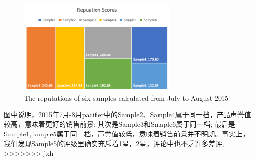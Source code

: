 \documentclass{mcmthesis}
\begin{document}
\begin{figure}[H] 
	\centering 
	\includegraphics[width=0.7\textwidth]{figures/reputations.png} 
	\caption{The reputations of six samples calculated from July to August 2015}
	\label{reputations} %
	
\end{figure}
图中说明，2015年7月-8月pacifier中的Sample2、Sample4属于同一档，产品声誉值较高，意味着更好的销售前景; 其次是Sample3和Smaple6属于同一档; 最后是Sample1,Sample5属于同一档，声誉值较低，意味着销售前景并不明朗。事实上，我们发现Sample5的评级里确实充斥着1星，2星，评论中也不乏许多差评。
>>>>>>> jxh
\end{document}
